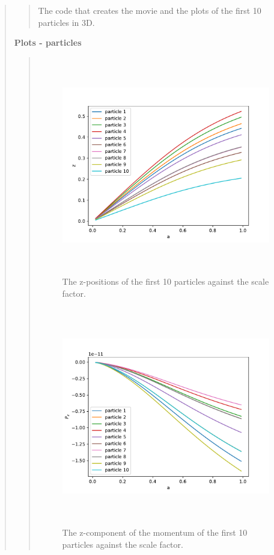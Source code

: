 \begin{quote}
\begin{quote}
The code that creates the movie and the plots of the first 10 particles in 3D. 

\end{quote}
\newpage


\textbf{Plots - particles}
\begin{quote}
\begin{figure}[!ht]
\centering
\includegraphics[width=14cm, height=9.5cm]{./Plots/4d_pos.pdf}
\caption{The z-positions of the first 10 particles against the scale factor.}
\end{figure}

\begin{figure}[!ht]
\centering
\includegraphics[width=14cm, height=9.5cm]{./Plots/4d_momentum.pdf}
\caption{The z-component of the momentum of the first 10 particles against the scale factor. }
\end{figure}
\end{quote}



\end{quote}





